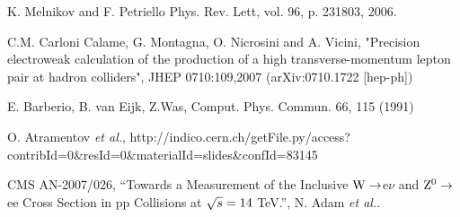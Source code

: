 \documentclass{cmspaper}
\begin{document}
 K. Melnikov and F. Petriello Phys. Rev. Lett, vol. 96, p. 231803, 2006.

C.M. Carloni Calame, G. Montagna, O. Nicrosini and A. Vicini, "Precision electroweak calculation of the production of a high transverse-momentum lepton pair at hadron colliders", JHEP 0710:109,2007 (arXiv:0710.1722 [hep-ph])

 E. Barberio, B. van Eijk, Z.Was, Comput. Phys. Commun. 66, 115 (1991)

O. Atramentov \textit{et al.}, http://indico.cern.ch/getFile.py/access?contribId=0\&resId=0\&materialId=slides\&confId=83145

 CMS AN-2007/026, ``Towards a Measurement of the Inclusive $\mathrm{W}\rightarrow$e$\nu$ and $\mathrm{Z^0}\rightarrow$ee Cross Section in pp Collisions at $\sqrt{s} = 14$ TeV.'',
N. Adam \textit{et al.}.




\newpage

\clearpage



\end{document}
